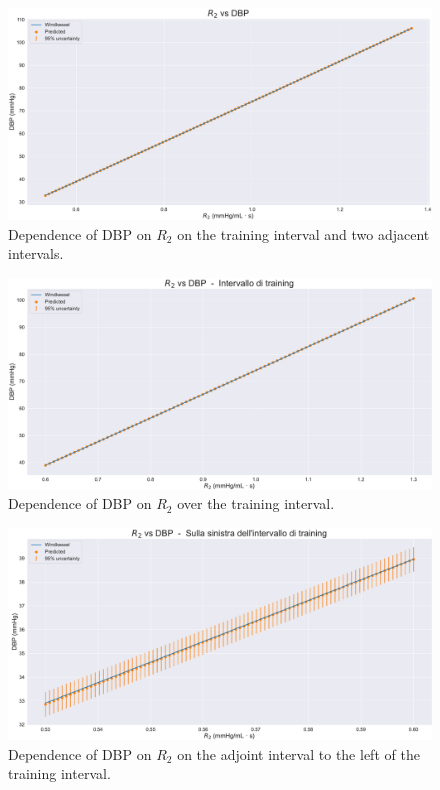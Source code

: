 \vspace{1cm}

\begin{figure}[!htb]
    \centering
    \includegraphics[width=1\textwidth]{images/Training (risultati)/DBP/DBP - R2 - full.pdf}
    \caption{Dependence of DBP on $R_2$ on the training interval and two adjacent intervals.}
    \label{DBP - R2 - full}
\end{figure}

\vspace{0.34cm}

\begin{figure}[!htb]
    \centering
    \includegraphics[width=1\textwidth]{images/Training (risultati)/DBP/DBP - R2 - training.pdf}
    \caption{Dependence of DBP on $R_2$ over the training interval.}
    \label{DBP - R2 - training}
\end{figure}

\begin{figure}
    \centering
    \includegraphics[width=1\textwidth]{images/Training (risultati)/DBP/DBP - R2 - sx.pdf}
    \caption{Dependence of DBP on $R_2$ on the adjoint interval to the left of the training interval.}
    \label{DBP - R2 - sx}
\end{figure}


